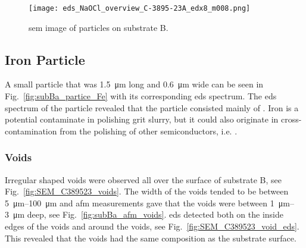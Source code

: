 \begin{figure}[htbp]
    \centering
    \texttt{[image: eds\_NaOCl\_overview\_C-3895-23A\_edx8\_m008.png]}
    \caption[\Ac{sem} image of  particles on substrate B.]{\Ac{sem} image of  particles on substrate B.}
    \label{fig:eds_NaOCl_overview}
\end{figure}

\subsection{Iron Particle}
A small particle that was \SI{1.5}{\micro\metre} long and \SI{0.6}{\micro\metre} wide can be seen in Fig.~\ref{fig:subBa_partice_Fe} with its corresponding \ac{eds} spectrum. The \ac{eds} spectrum of the particle revealed that the particle consisted mainly of . Iron is a potential contaminate in polishing grit slurry, but it could also originate in cross-contamination from the polishing of other semiconductors, i.e.  \citep{benson2015as-received}.

\subsubsection{Voids}
Irregular shaped voids were observed all over the surface of substrate B, see Fig.~\ref{fig:SEM_C389523_voids}. The width of the voids tended to be between \SIrange{5}{100}{\micro\metre} and \ac{afm} measurements gave that the voids were between \SIrange{1}{3}{\micro\metre} deep, see Fig.~\ref{fig:subBa_afm_voids}. \Ac{eds} detected  both on the inside edges of the voids and around the voids, see Fig.~\ref{fig:SEM_C389523_void_eds}. This revealed that the voids had the same composition as the substrate surface.

